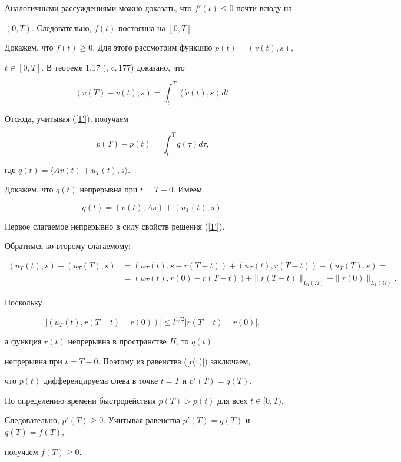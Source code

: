 \begin{pf}
Аналогичными рассуждениями можно доказать, что $f'(t)\le0$ почти всюду на 


$(0,T)$. Следовательно, $f(t)$ постоянна на $[0,T]$.





Докажем, что $f(t)\ge0$. Для этого рассмотрим функцию $p(t)=(v(t),s)$, 


$t\in[0,T]$. В теореме 1.17 (\cite{G}, c.\,177) доказано, что


$$


(v(T)-v(t),s)=\int_t^T\left\langle\Dot v(t),s\right\rangle dt.


$$


Отсюда, учитывая (\ref{1'}), получаем


\begin{equation} \label{r(t)}


p(T)-p(t)=\int_t^Tq(\tau)d\tau,


\end{equation}


где $q(t)=\langle Av(t)+u_T(t),s\rangle$.





Докажем, что $q(t)$ непрерывна при $t=T-0$. Имеем 


$$


q(t)=(v(t),As)+(u_T(t),s).


$$


Первое слагаемое непрерывно в силу свойств решения (\ref{1'}).


Обратимся ко второму слагаемому:


\begin{align*}


(u_T(t),s)-(u_T(T),s)&=(u_T(t),s-r(T-t))+(u_T(t),r(T-t))-(u_T(T),s)= \\


&=(u_T(t),r(0)-r(T-t))+\|r(T-t) \|_{L_1(\Omega)} -\|r(0) \|_{L_1(\Omega)}.


\end{align*}


Поскольку 


$$


|(u_T(t),r(T-t)-r(0))|\le l^{1/2}|r(T-t)-r(0)|,


$$


а функция $r(t)$ непрерывна в пространстве $H$, то $q(t)$ 


непрерывна при $t=T-0$. Поэтому из равенства (\ref{r(t)}) заключаем,


что $p(t)$ дифференцируема слева в точке $t=T$ и $p'(T)=q(T)$.





По определению времени быстродействия $p(T)>p(t)$ для всех $t\in[0,T)$.


Следовательно, $p'(T)\ge0$. Учитывая равенства $p'(T)=q(T)$ и $q(T)=f(T)$,


получаем $f(T)\ge0$.


\end{pf}





